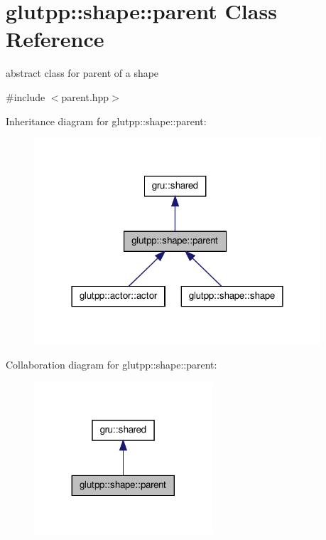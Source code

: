 \hypertarget{classglutpp_1_1shape_1_1parent}{\section{glutpp\-:\-:shape\-:\-:parent \-Class \-Reference}
\label{classglutpp_1_1shape_1_1parent}
}


abstract class for parent of a shape  




{\ttfamily \#include $<$parent.\-hpp$>$}



\-Inheritance diagram for glutpp\-:\-:shape\-:\-:parent\-:\nopagebreak
\begin{figure}[H]
\begin{center}
\leavevmode
\includegraphics[width=302pt]{classglutpp_1_1shape_1_1parent__inherit__graph}
\end{center}
\end{figure}


\-Collaboration diagram for glutpp\-:\-:shape\-:\-:parent\-:\nopagebreak
\begin{figure}[H]
\begin{center}
\leavevmode
\includegraphics[width=188pt]{classglutpp_1_1shape_1_1parent__coll__graph}
\end{center}
\end{figure}
